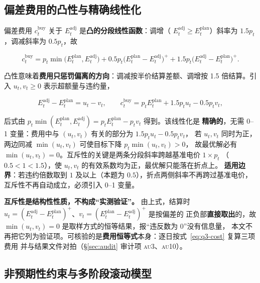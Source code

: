 \subsection{偏差费用的凸性与精确线性化}

偏差费用 \(c^{\text{buy}}_t\) 关于 \(E^{\text{adj}}_t\) 是\textbf{凸的分段线性函数}：调增（\allowbreak
\(E^{\text{adj}}_t\ge E^{\text{plan}}_t\)）斜率为 \(1.5p_t\)，调减斜率为 \(0.5p_t\)，故

\begin{equation}
  c_t^{\text{buy}}
  =p_t\min\bigl(E^{\text{plan}}_t,E^{\text{adj}}_t\bigr)
  +0.5p_t\bigl(E^{\text{plan}}_t-E^{\text{adj}}_t\bigr)^{+}
  +1.5p_t\bigl(E^{\text{adj}}_t-E^{\text{plan}}_t\bigr)^{+}.
  \label{eq:q3-cost}
\end{equation}

凸性意味着\textbf{费用只惩罚偏离的方向}：调减按半价结算差额、调增按 1.5 倍结算。引入
\(u_t,v_t\ge0\) 表示超额量与违约量，

\begin{equation}
  E^{\text{adj}}_t-E^{\text{plan}}_t=u_t-v_t,\qquad
  c_t^{\text{buy}}=p_tE^{\text{plan}}_t+1.5p_tu_t-0.5p_tv_t ,
  \label{eq:q3-lin}
\end{equation}

后式由 \(p_t\min(E^{\text{plan}}_t,E^{\text{adj}}_t)=p_tE^{\text{plan}}_t-p_tv_t\) 得到。该线性化是
\textbf{精确的}，无需 0--1 变量：费用中与 \((u_t,v_t)\) 有关的部分为 \(1.5p_tu_t-0.5p_tv_t\)，
若 \(u_t,v_t\) 同时为正，两边同减 \(\min(u_t,v_t)\) 可使目标下降 \(p_t\min(u_t,v_t)>0\)，
故最优解必有 \(\min(u_t,v_t)=0\)。互斥性的关键是两条分段斜率跨越基准电价 \(1\times p_t\)
（\(0.5<1<1.5\)），使 \(u_t,v_t\) 的有效系数均为正，最优解只能落在折点上。
\textbf{适用边界}：若违约倍数取到 \(1\) 及以上（本题为 \(0.5\)），折点两侧斜率不再跨过基准电价，
互斥性不再自动成立，必须引入 0--1 变量。

\textbf{互斥性是结构性性质，不构成“实测验证”。} 由上式，结算时
\(u_t=(E^{\text{adj}}_t-E^{\text{plan}}_t)^{+}\)、\(v_t=(E^{\text{plan}}_t-E^{\text{adj}}_t)^{+}\) 是按偏差的
正负部\textbf{直接取出}的，故 \(\min(u_t,v_t)=0\) 是取样方式的恒等结果，报“违反数为 0”没有信息量，
本文不再把它列为验证项。可核验的是\textbf{费用恒等式}本身：逐日按式~\eqref{eq:q3-cost} 复算三项费用
并与结果文件对拍（\S\ref{sec:audit} 审计项 \textsc{au}3、\textsc{au}10）。

\subsection{非预期性约束与多阶段滚动模型}\label{sec:q3-mpc}\label{sec:q3-roll}

